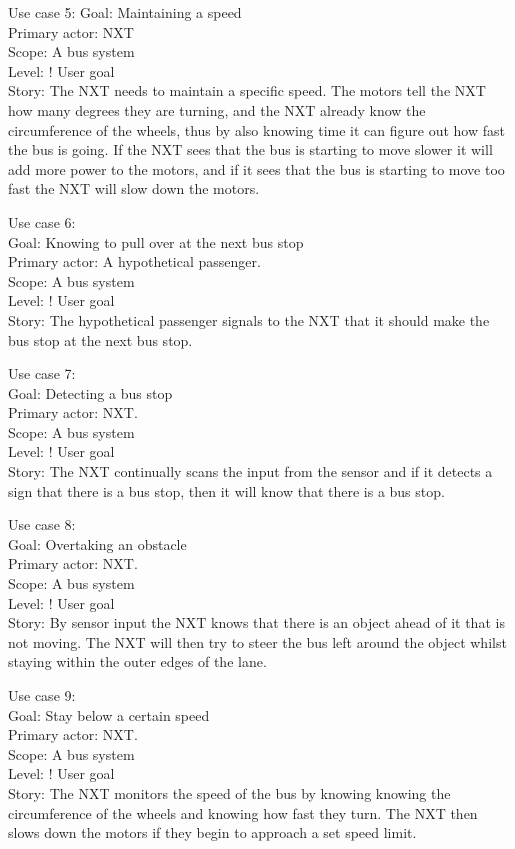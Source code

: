 Use case 5:
Goal: Maintaining a speed\\
Primary actor: NXT\\
Scope: A bus system\\
Level: ! User goal\\
Story: The NXT needs to maintain a specific speed. The motors tell the NXT how many degrees they are turning, and the NXT already know the circumference of the wheels, thus by also knowing time it can figure out how fast the bus is going. If the NXT sees that the bus is starting to move slower it will add more power to the motors, and if it sees that the bus is starting to move too fast the NXT will slow down the motors.

Use case 6:\\
Goal: Knowing to pull over at the next bus stop\\
Primary actor: A hypothetical passenger.\\
Scope: A bus system\\
Level: ! User goal\\
Story: The hypothetical passenger signals to the NXT that it should make the bus stop at the next bus stop.

Use case 7:\\
Goal: Detecting a bus stop\\
Primary actor: NXT.\\
Scope: A bus system\\
Level: ! User goal\\
Story: The NXT continually scans the input from the sensor and if it detects a sign that there is a bus stop, then it will know that there is a bus stop.

Use case 8:\\
Goal: Overtaking an obstacle\\
Primary actor: NXT.\\
Scope: A bus system\\
Level: ! User goal\\
Story: By sensor input the NXT knows that there is an object ahead of it that is not moving. The NXT will then try to steer the bus left around the object whilst staying within the outer edges of the lane.

Use case 9:\\
Goal: Stay below a certain speed\\
Primary actor: NXT.\\
Scope: A bus system\\
Level: ! User goal\\
Story: The NXT monitors the speed of the bus by knowing knowing the circumference of the wheels and knowing how fast they turn. The NXT then slows down the motors if they begin to approach a set speed limit.


